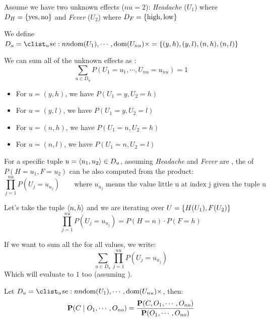 

\begin{tcolorbox}[
    colback=blue!3!white,
    colframe=blue!70!white,
    title=Notation Understanding]
Assume we have two unknown effects ($nu=2$): \textit{Headache} ($U_1$) where $D_H=\left\{\text{yes}, \text{no}\right\}$ and \textit{Fever} ($U_2$) where $D_F=\left\{\text{high}, \text{low}\right\}$

We define $D_u = \cartprod{\text{dom}(U_1), \cdots, \text{dom}(U_{nu})} = \set{(y, h), (y, l), (n, h), (n, l)}$

We can sum all  of the unknown effects as :
\[
\sum_{u \in D_u} P(U_1=u_1,\cdots, U_{nu}=u_{nu}) = 1
\]

\begin{itemize}
    \item For $u=(y,h)$, we have $P(U_1=y, U_{2}=h)$
    \item For $u=(y,l)$, we have $P(U_1=y, U_{2}=l)$
    \item For $u=(n,h)$, we have $P(U_1=n, U_{2}=h)$
    \item For $u=(n,l)$, we have $P(U_1=n, U_{2}=l)$
\end{itemize}

For a specific tuple $u=\left\langle u_1, u_2 \right\rangle \in D_u$, assuming \textit{Headache} and \textit{Fever} are , the  of $P(H=u_1, F=u_2)$ can be also computed from the product:
\[
\prod_{j=1}^{nu} P(U_j=u_{u_j}) \qquad \text{where }u_{u_j}\text{ means the value little u at index j given the tuple u}
\]  

Let's take the tuple $\left\langle n,h \right\rangle$ and we are iterating over $U= \left\{H (U_1),F (U_2)\right\}$
\[
\prod_{j=1}^{nu} P(U_j=u_{u_j}) = P(H=n) \cdot P(F=h)
\]

If we want to sum all the  for all values, we write:
\[
\sum_{u \in D_u} \prod_{j=1}^{nu}  P(U_j=u_{u_j})
\]
Which will evaluate to $1$ too (assuming ).
\end{tcolorbox}


Let $D_u = \cartprod{\text{dom}(U_1), \cdots, \text{dom}(U_{nu})}$, then:
\[
\textbf{P}(C \mid O_1, \cdots, O_{no}) = \frac{\textbf{P}(C,O_1, \cdots, O_{no})}{\textbf{P}(O_1, \cdots, O_{no})}
\]

